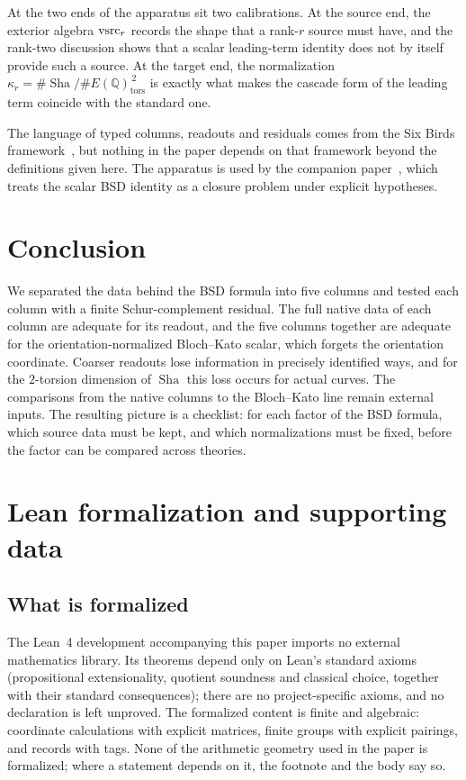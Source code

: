 \documentclass[11pt]{article}
\theoremstyle{definition}
\newcommand{\Q}{\mathbb{Q}}
\newcommand{\Sha}{\operatorname{Sha}}
\newcommand{\tors}{\operatorname{tors}}
\newcommand{\kapr}{\kappa_r}
\begin{document}
At the two ends of the apparatus sit two calibrations.  At the source end,
the exterior algebra $\mathrm{vsrc}_r$ records the shape that a rank-$r$ source
must have, and the rank-two discussion shows that a scalar leading-term
identity does not by itself provide such a source.  At the target end,
the normalization $\kapr=\#\Sha/\#E(\Q)_{\tors}^{\,2}$ is exactly what
makes the cascade form of the leading term coincide with the standard
one.

The language of typed columns, readouts and residuals comes from the Six
Birds framework~\citep{TsiokosNeedles2026,TsiokosFoundationsII2026,TsiokosFoundationsIII2026},
but nothing in the paper depends on that framework beyond the definitions
given here.  The apparatus is used by the companion
paper~\citep{TsiokosBSDClosure2026}, which treats the scalar BSD identity
as a closure problem under explicit hypotheses.
 \section{Conclusion}\label{sec:conclusion}


We separated the data behind the BSD formula into five columns and tested
each column with a finite Schur-complement residual.  The full native data
of each column are adequate for its readout, and the five columns together
are adequate for the orientation-normalized Bloch--Kato scalar, which
forgets the orientation coordinate.  Coarser readouts lose information in
precisely identified ways, and for the $2$-torsion dimension of $\Sha$
this loss occurs for actual curves.  The comparisons from the native
columns to the Bloch--Kato line remain external inputs.  The resulting
picture is a checklist: for each factor of the BSD formula, which source
data must be kept, and which normalizations must be fixed, before the
factor can be compared across theories.
 \appendix
{}
\section{Lean formalization and supporting data}\label{app:formalization}

\subsection*{What is formalized}

The Lean~4 development accompanying this paper imports no external
mathematics library.  Its theorems depend only on Lean's standard axioms
(propositional extensionality, quotient soundness and classical choice,
together with their standard consequences); there are no project-specific
axioms, and no declaration is left unproved.  The formalized content is
finite and algebraic: coordinate calculations with explicit matrices,
finite groups with explicit pairings, and records with tags.  None of the
arithmetic geometry used in the paper is formalized; where a statement
depends on it, the footnote and the body say so.
\end{document}
